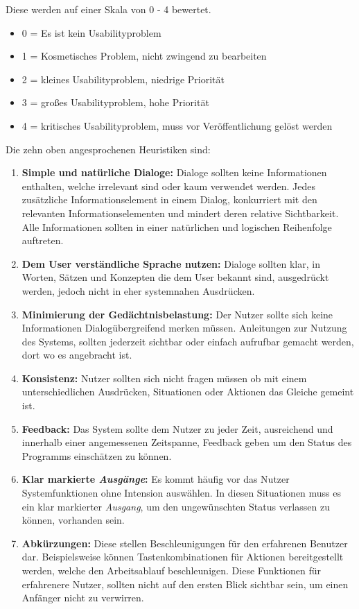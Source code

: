 \documentclass[draft=false
              ,paper=a4
              ,twoside=false
              ,fontsize=11pt
              ,headsepline
              ,BCOR10mm
              ,DIV11
              ]{scrbook}
\begin{document}
Diese werden auf einer Skala von 0 - 4 bewertet. 

\begin{itemize}
  \item[] 0 = Es ist kein Usabilityproblem
  \item[] 1 = Kosmetisches Problem, nicht zwingend zu bearbeiten
  \item[] 2 = kleines Usabilityproblem, niedrige Priorität
  \item[] 3 = großes Usabilityproblem, hohe Priorität
  \item[] 4 = kritisches Usabilityproblem, muss vor Veröffentlichung gelöst werden 
\end{itemize}

Die zehn oben angesprochenen Heuristiken sind:

\begin{enumerate}
  \item \textbf{Simple und natürliche Dialoge:} Dialoge sollten keine Informationen enthalten, welche irrelevant sind oder kaum verwendet werden. Jedes zusätzliche Informationselement in einem Dialog, konkurriert mit den relevanten Informationselementen und mindert deren relative Sichtbarkeit. Alle Informationen sollten in einer natürlichen und logischen Reihenfolge auftreten.
  \item \textbf{Dem User verständliche Sprache nutzen:} Dialoge sollten klar, in Worten, Sätzen und Konzepten die dem User bekannt sind, ausgedrückt werden, jedoch nicht in eher systemnahen Ausdrücken.
  \item \textbf{Minimierung der Gedächtnisbelastung:} Der Nutzer sollte sich keine Informationen Dialogübergreifend merken müssen. Anleitungen zur Nutzung des Systems, sollten jederzeit sichtbar oder einfach aufrufbar gemacht werden, dort wo es angebracht ist.
  \item \textbf{Konsistenz:} Nutzer sollten sich nicht fragen müssen ob mit einem unterschiedlichen Ausdrücken, Situationen oder Aktionen das Gleiche gemeint ist.
  \item \textbf{Feedback:} Das System sollte dem Nutzer zu jeder Zeit, ausreichend und innerhalb einer angemessenen Zeitspanne, Feedback geben um den Status des Programms einschätzen zu können. 
  \item \textbf{Klar markierte \textit{Ausgänge}:} Es kommt häufig vor das Nutzer Systemfunktionen ohne Intension auswählen. In diesen Situationen muss es ein klar markierter \textit{Ausgang}, um den ungewünschten Status verlassen zu können, vorhanden sein. 
  \item \textbf{Abkürzungen:} Diese stellen Beschleunigungen für den erfahrenen Benutzer dar. Beispielsweise können Tastenkombinationen für Aktionen bereitgestellt werden, welche den Arbeitsablauf beschleunigen.  Diese Funktionen für erfahrenere Nutzer, sollten nicht auf den ersten Blick sichtbar sein, um einen Anfänger nicht zu verwirren.

\end{enumerate}
\end{document}
